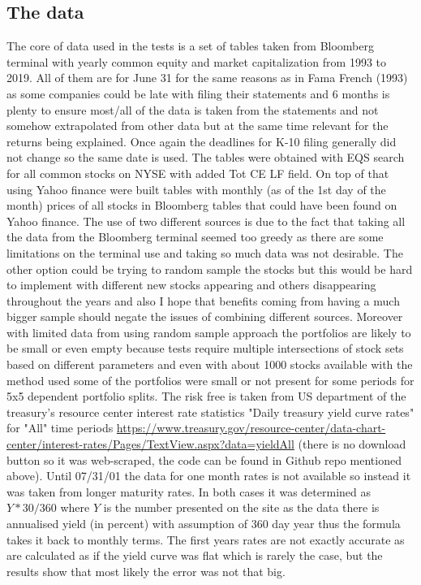 \documentclass[a4paper,12pt]{article} %
\begin{document}
	\subsection{The data}
	The core of data used in the tests is a set of tables taken from Bloomberg terminal with yearly common equity and market capitalization from 1993 to 2019. All of them are for June 31 for the same reasons as in Fama French (1993) as some companies could be late with filing their statements and 6 months is plenty to ensure most/all of the data is taken from the statements and not somehow extrapolated from other data but at the same time relevant for the returns being explained. Once again the deadlines for K-10 filing generally did not change so the same date is used. The tables were obtained with EQS search for all common stocks on NYSE with added Tot CE LF field. On top of that using Yahoo finance were built tables with monthly (as of the 1st day of the month) prices of all stocks in Bloomberg tables that could have been found on Yahoo finance. The use of two different sources is due to the fact that taking all the data from the Bloomberg terminal seemed too greedy as there are some limitations on the terminal use and taking so much data was not desirable. The other option could be trying to random sample the stocks but this would be hard to implement with different new stocks appearing and others disappearing throughout the years and also I hope that benefits coming from having a much bigger sample should negate the issues of combining different sources. Moreover with limited data from using random sample approach the portfolios are likely to be small or even empty because tests require multiple intersections of stock sets based on different parameters and even with about 1000 stocks available with the method used some of the portfolios were small or not present for some periods for 5x5 dependent portfolio splits. The risk free is taken from US department of the treasury's resource center interest rate statistics "Daily treasury yield curve rates" for "All" time periods \url{https://www.treasury.gov/resource-center/data-chart-center/interest-rates/Pages/TextView.aspx?data=yieldAll} (there is no download button so it was web-scraped, the code can be found in Github repo mentioned above). Until 07/31/01 the data for one month rates is not available so instead it was taken from longer maturity rates. In both cases it was determined as $Y * 30/360$ where $Y$ is the number presented on the site as the data there is annualised yield (in percent) with assumption of 360 day year thus the formula takes it back to monthly terms. The first years rates are not exactly accurate as are calculated as if the yield curve was flat which is rarely the case, but the results show that most likely the error was not that big.
\end{document}
